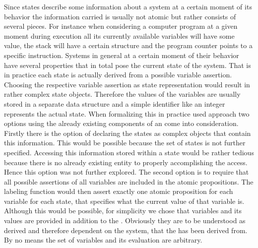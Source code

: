 \documentclass[preview]{standalone}
\begin{document}
Since states describe some information about a system at a certain moment of its behavior the information carried is usually not atomic but rather consists of several pieces. For instance when considering a computer program at a given moment during execution all its currently available variables will have some value, the stack will have a certain structure and the program counter points to a specific instruction. Systems in general at a certain moment of their behavior have several properties that in total pose the current state of the system. That is in practice each state is actually derived from a possible variable assertion. Choosing the respective variable assertion as state representation would result in rather complex state objects. Therefore the values of the variables are usually stored in a separate data structure and a simple identifier like an integer represents the actual state. When formalizing this in practice used approach two options using the already existing components of an \mdpN come into consideration. Firstly there is the option of declaring the states as complex objects that contain this information. This would be possible because the set of states is not further specified. Accessing this information stored within a state would be rather tedious because there is no already existing entity to properly accomplishing the access. Hence this option was not further explored. The second option is to require that all possible assertions of all variables are included in the atomic propositions. The labeling function would then assert exactly one atomic proposition for each variable for each state, that specifies what the current value of that variable is. Although this would be possible, for simplicity we chose that variables and its values are provided in addition to the \mdpN. Obviously they are to be understood as derived and therefore dependent on the  system, that the \mdpN has been derived from. By no means the set of variables and its evaluation are arbitrary.
\end{document}

